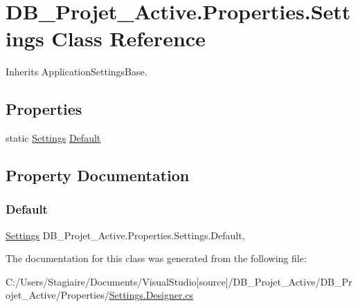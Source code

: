 \hypertarget{class_d_b___projet___active_1_1_properties_1_1_settings}{}\section{D\+B\+\_\+\+Projet\+\_\+\+Active.\+Properties.\+Settings Class Reference}
\label{class_d_b___projet___active_1_1_properties_1_1_settings}


Inherits Application\+Settings\+Base.

\subsection*{Properties}
\begin{DoxyCompactItemize}
\item 
static \mbox{\hyperlink{class_d_b___projet___active_1_1_properties_1_1_settings}{Settings}} \mbox{\hyperlink{class_d_b___projet___active_1_1_properties_1_1_settings_af88ae2bee5f04d17b21f62ae0bed02a6}{Default}}
\end{DoxyCompactItemize}


\subsection{Property Documentation}
\mbox{\label{class_d_b___projet___active_1_1_properties_1_1_settings_af88ae2bee5f04d17b21f62ae0bed02a6}} 
\subsubsection{\texorpdfstring{Default}{Default}}
{\footnotesize\ttfamily \mbox{\hyperlink{class_d_b___projet___active_1_1_properties_1_1_settings}{Settings}} D\+B\+\_\+\+Projet\+\_\+\+Active.\+Properties.\+Settings.\+Default\hspace{0.3cm}{\ttfamily [static]}, {\ttfamily [get]}}



The documentation for this class was generated from the following file\+:\begin{DoxyCompactItemize}
\item 
C\+:/\+Users/\+Stagiaire/\+Documents/\+Visual\+Studio\mbox{[}source\mbox{]}/\+D\+B\+\_\+\+Projet\+\_\+\+Active/\+D\+B\+\_\+\+Projet\+\_\+\+Active/\+Properties/\mbox{\hyperlink{_settings_8_designer_8cs}{Settings.\+Designer.\+cs}}\end{DoxyCompactItemize}
